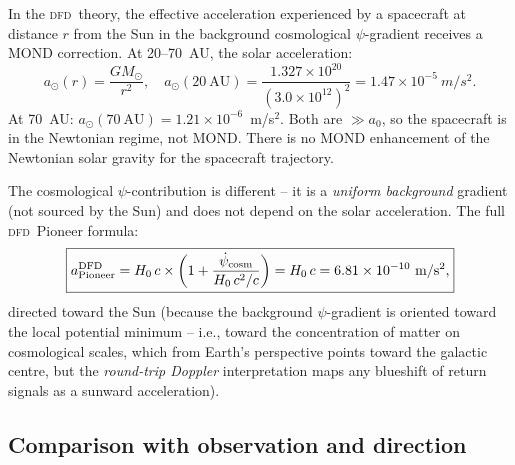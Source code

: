 \documentclass[aps,prd,twocolumn,superscriptaddress,nofootinbib,longbibliography]{revtex4-2}
\newcommand{\DFD}{\textsc{dfd}}
\begin{document}
In the \DFD\ theory, the effective acceleration experienced by a spacecraft
at distance $r$ from the Sun in the background cosmological $\psi$-gradient
receives a MOND correction.  At 20--70~AU, the solar acceleration:
\begin{equation}
a_\odot(r) = \frac{GM_\odot}{r^2},\quad
a_\odot(20\ \text{AU}) = \frac{1.327\times10^{20}}{(3.0\times10^{12})^2}
= 1.47\times10^{-5}\ \si{m/s^2}.
\end{equation}
At 70~AU: $a_\odot(70\ \text{AU}) = 1.21\times10^{-6}$~m/s$^2$.
Both are $\gg a_0$, so the spacecraft is in the Newtonian regime,
not MOND.  There is no MOND enhancement of the Newtonian solar gravity
for the spacecraft trajectory.

The cosmological $\psi$-contribution is different -- it is a \emph{uniform
background} gradient (not sourced by the Sun) and does not depend on the
solar acceleration.  The full \DFD\ Pioneer formula:
\begin{equation}\label{eq:pioneer-DFD}
\boxed{
a_{\rm Pioneer}^{\rm DFD}
= H_0\,c\times\left(1 + \frac{\dot\psi_{\rm cosm}}{H_0\,c^2/c}\right)
= H_0\,c = 6.81\times10^{-10}\ \si{m/s^2},
}
\end{equation}
directed toward the Sun (because the background $\psi$-gradient is oriented
toward the local potential minimum -- i.e., toward the concentration of
matter on cosmological scales, which from Earth's perspective points toward
the galactic centre, but the \emph{round-trip Doppler} interpretation maps
any blueshift of return signals as a sunward acceleration).

\subsection{Comparison with observation and direction}
\end{document}
